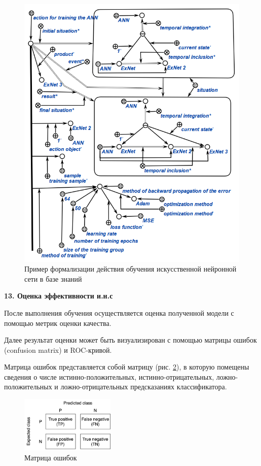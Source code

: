 				\begin{figure}
					\centering
					\includegraphics[width=0.9\linewidth]{figures/ann_trainning_en.png}
					\caption{Пример формализации действия обучения искусственной нейронной сети в базе знаний \cite{Kovalev2022}}
					\label{fig:ann_trainning_scg}
				\end{figure}
				
				\textbf{13. Оценка эффективности и.н.с}
				
				После выполнения обучения осуществляется оценка полученной модели с помощью метрик оценки качества.
				
				Далее результат оценки может быть визуализирован с помощью матрицы ошибок (confusion matrix) и ROC-кривой.
				
				Матрица ошибок представляется собой матрицу (рис. \ref{fig:conf_matrix}), в которую помещены сведения о числе истинно-положительных, истинно-отрицательных, ложно-положительных и ложно-отрицательных предсказаниях классификатора.
				
				\begin{figure}[h]
					\centering
					\includegraphics[width=0.4\textwidth]{figures/conf_matrix.png}
					\caption{Матрица ошибок}
					\label{fig:conf_matrix}
				\end{figure}
				
